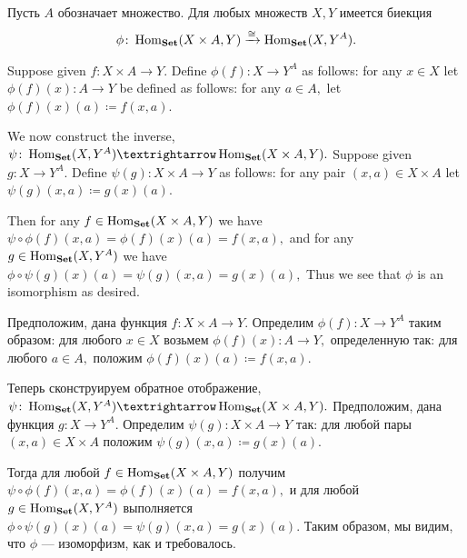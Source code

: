 \documentclass[../main/CT4S-EN-RU]{subfiles}
\begin{document}
\begin{propositionRUS}[Каррирование]\label{prop:curry}
Пусть $A$ обозначает множество. Для любых множеств $X,Y$ имеется биекция%
%
\begin{align}\label{dia:curry bijection}
\phi\colon\operatorname{Hom}_{\mathbf{Set}}(X\times A,Y)\xrightarrow{\cong}\operatorname{Hom}_{\mathbf{Set}}(X,Y^A).
\end{align}
\end{propositionRUS}

\begin{proofENG}
Suppose given $f\colon X\times A{→} Y.$ Define $\phi(f)\colon X{→} Y^A$ as follows: for any $x\in X$ let $\phi(f)(x)\colon A{→} Y$ be defined as follows: for any $a\in A,$ let $\phi(f)(x)(a){\coloneqq}f(x,a).$ 

We now construct the inverse, $\psi\colon\Hom_\Set(X,Y^A){→}\Hom_\Set(X\times A,Y).$ Suppose given $g\colon X{→} Y^A.$ Define $\psi(g)\colon X\times A{→} Y$ as follows: for any pair $(x,a)\in X\times A$ let $\psi(g)(x,a){\coloneqq}g(x)(a).$ 

Then for any $f\in\operatorname{Hom}_{\mathbf{Set}}(X\times A,Y)$ we have $\psi\circ\phi(f)(x,a)=\phi(f)(x)(a)=f(x,a),$ and for any $g\in\operatorname{Hom}_{\mathbf{Set}}(X,Y^A)$ we have $\phi\circ\psi(g)(x)(a)=\psi(g)(x,a)=g(x)(a),$ Thus we see that $\phi$ is an isomorphism as desired.
\end{proofENG}

\begin{proofRUS}
Предположим, дана функция $f\colon X\times A{→} Y.$ Определим $\phi(f)\colon X{→} Y^A$ таким образом: для любого $x\in X$ возьмем $\phi(f)(x)\colon A{→} Y,$ определенную так: для любого $a\in A,$ положим $\phi(f)(x)(a){\coloneqq}f(x,a).$ 

Теперь сконструируем обратное отображение, $\psi\colon\Hom_\Set(X,Y^A){→}\Hom_\Set(X\times A,Y).$  Предположим, дана функция $g\colon X{→} Y^A.$ Определим $\psi(g)\colon X\times A{→} Y$ так: для любой пары $(x,a)\in X\times A$ положим $\psi(g)(x,a){\coloneqq}g(x)(a).$ 

Тогда для любой $f\in\operatorname{Hom}_{\mathbf{Set}}(X\times A,Y)$ получим $\psi\circ\phi(f)(x,a)=\phi(f)(x)(a)=f(x,a),$ и для любой $g\in\operatorname{Hom}_{\mathbf{Set}}(X,Y^A)$ выполняется $\phi\circ\psi(g)(x)(a)=\psi(g)(x,a)=g(x)(a).$ Таким образом, мы видим, что $\phi$ — изоморфизм, как и требовалось.
\end{proofRUS}
\end{document}
